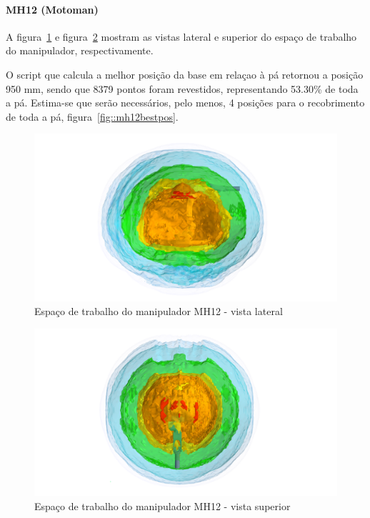 \paragraph{MH12 (Motoman)}
A figura~\ref{fig::mh12cin1} e figura~\ref{fig::mh12cin2} mostram as vistas
lateral e superior do espaço de trabalho do manipulador, respectivamente.

O script que calcula a melhor posição da base em relaçao à pá retornou a posição
950 mm, sendo que 8379 pontos foram revestidos, representando 53.30\% de toda a
pá. Estima-se que serão necessários, pelo menos, 4 posições para o recobrimento
de toda a pá, figura~\ref{fig::mh12bestpos}.

\begin{figure}[h!]	
	\includegraphics[width=\columnwidth]{figs/bighatch/mh12_front.png}
	\caption{Espaço de trabalho do manipulador MH12 - vista lateral}
	\label{fig::mh12cin1}
\end{figure}

\begin{figure}[h!]	
	\includegraphics[width=\columnwidth]{figs/bighatch/mh12_top.png}
	\caption{Espaço de trabalho do manipulador MH12 - vista superior}
	\label{fig::mh12cin2}
\end{figure}

